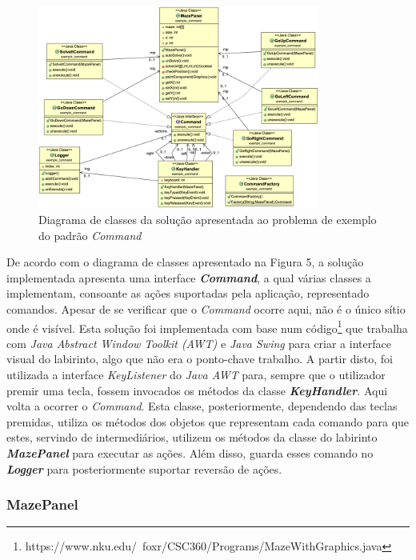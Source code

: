 \documentclass[10pt,portuguese]{article}
\begin{document}
\begin{figure}[!h]
    \centering
    \includegraphics[width=350]{images/command/UML_Example.png}
    \caption{Diagrama de classes da solução apresentada ao problema de exemplo do padrão \textit{Command}}
\end{figure}

\par De acordo com o diagrama de classes apresentado na Figura 5, a solução implementada apresenta uma interface \textbf{\textit{Command}}, a qual várias classes a implementam, consoante as ações suportadas pela aplicação, representado comandos. Apesar de se verificar que o \textit{Command} ocorre aqui, não é o único sítio onde é visível. Esta solução foi implementada com base num código\footnote{https://www.nku.edu/~foxr/CSC360/Programs/MazeWithGraphics.java} que trabalha com \textit{Java Abstract Window Toolkit (AWT)} e \textit{Java Swing} para criar a interface visual do labirinto, algo que não era o ponto-chave trabalho. A partir disto, foi utilizada a interface \textit{KeyListener} do \textit{Java AWT} para, sempre que o utilizador premir uma tecla, fossem invocados os métodos da classe \textbf{\textit{KeyHandler}}. Aqui volta a ocorrer o \textit{Command}. Esta classe, posteriormente, dependendo das teclas premidas, utiliza os métodos dos objetos que representam cada comando para que estes, servindo de intermediários, utilizem os métodos da classe do labirinto \textbf{\textit{MazePanel}} para executar as ações. Além disso, guarda esses comando no \textbf{\textit{Logger}} para posteriormente suportar reversão de ações.

\subsubsection{MazePanel}
\end{document}
